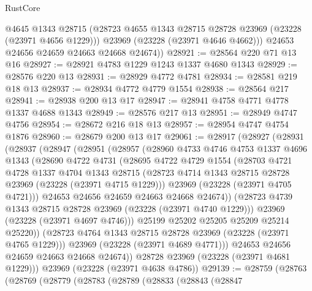 \begin{lexlean}{RustCore}
\begin{coremodule}
          @4645
          @1343
          @28715
          (@28723 @4655 @1343 @28715 @28728 @23969 (@23228 (@23971 @4656 @1229)))
          @23969
          (@23228 (@23971 @4646 @4662)))
        @24653
        @24656
        @24659
        @24663
        @24668
        @24674))
@28921 := @28564 @220 @71 @13 @16
@28927 := @28921 @4783 @1229 @1243 @1337 @4680 @1343
@28929 := @28576 @220 @13
@28931 := @28929 @4772 @4781
@28934 := @28581 @219 @18 @13
@28937 := @28934 @4772 @4779 @1554
@28938 := @28564 @217
@28941 := @28938 @200 @13 @17
@28947 := @28941 @4758 @4771 @4778 @1337 @4688 @1343
@28949 := @28576 @217 @13
@28951 := @28949 @4747 @4756
@28954 := @28672 @216 @18 @13
@28957 := @28954 @4747 @4754 @1876
@28960 := @28679 @200 @13 @17
@29061 := @28917
    (@28927
      (@28931
        (@28937
          (@28947
            (@28951
              (@28957
                (@28960
                  @4733
                  @4746
                  @4753
                  @1337
                  @4696
                  @1343
                  (@28690
                    @4722
                    @4731
                    (@28695
                      @4722
                      @4729
                      @1554
                      (@28703
                        @4721
                        @4728
                        @1337
                        @4704
                        @1343
                        @28715
                        (@28723 @4714 @1343 @28715 @28728 @23969 (@23228 (@23971 @4715 @1229)))
                        @23969
                        (@23228 (@23971 @4705 @4721)))
                      @24653
                      @24656
                      @24659
                      @24663
                      @24668
                      @24674))
                  (@28723 @4739 @1343 @28715 @28728 @23969 (@23228 (@23971 @4740 @1229)))
                  @23969
                  (@23228 (@23971 @4697 @4746)))
                @25199
                @25202
                @25205
                @25209
                @25214
                @25220))
            (@28723 @4764 @1343 @28715 @28728 @23969 (@23228 (@23971 @4765 @1229)))
            @23969
            (@23228 (@23971 @4689 @4771)))
          @24653
          @24656
          @24659
          @24663
          @24668
          @24674))
      @28728
      @23969
      (@23228 (@23971 @4681 @1229)))
    @23969
    (@23228 (@23971 @4638 @4786))
@29139 := @28759
    (@28763
      (@28769
        (@28779
          (@28783
            (@28789
              (@28833
                (@28843
                  (@28847

\end{coremodule}
\end{lexlean}
